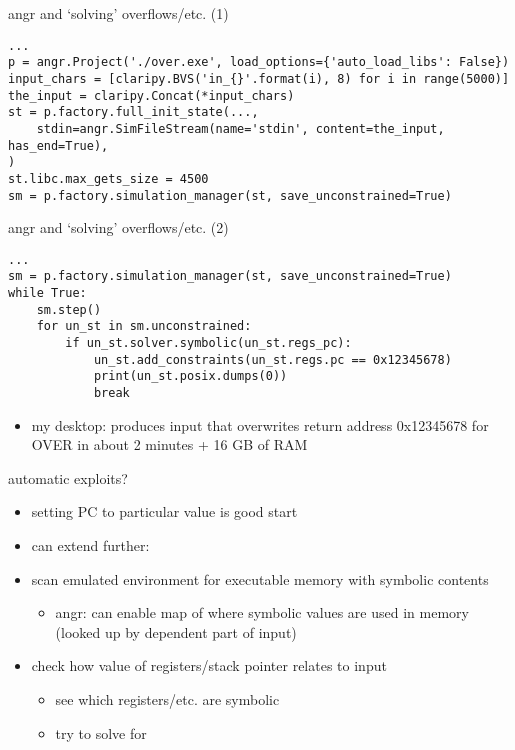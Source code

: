 \begin{frame}[fragile]{angr and `solving' overflows/etc. (1)}
\begin{Verbatim}[fontsize=\fontsize{9}{10}]
...
p = angr.Project('./over.exe', load_options={'auto_load_libs': False})
input_chars = [claripy.BVS('in_{}'.format(i), 8) for i in range(5000)]
the_input = claripy.Concat(*input_chars)
st = p.factory.full_init_state(...,
    stdin=angr.SimFileStream(name='stdin', content=the_input, has_end=True),
)
st.libc.max_gets_size = 4500
sm = p.factory.simulation_manager(st, save_unconstrained=True)
\end{Verbatim}
\end{frame}

\begin{frame}[fragile]{angr and `solving' overflows/etc. (2)}
\begin{Verbatim}[fontsize=\fontsize{9}{10}]
...
sm = p.factory.simulation_manager(st, save_unconstrained=True)
while True:
    sm.step()
    for un_st in sm.unconstrained:
        if un_st.solver.symbolic(un_st.regs_pc):
            un_st.add_constraints(un_st.regs.pc == 0x12345678)
            print(un_st.posix.dumps(0))
            break
\end{Verbatim}
\begin{itemize}
\item my desktop: produces input that overwrites return address 0x12345678 for OVER in about 2 minutes + 16 GB of RAM
\end{itemize}
\end{frame}

\begin{frame}{automatic exploits?}
\begin{itemize}
\item setting PC to particular value is good start
\item can extend further:
\item scan emulated environment for executable memory with symbolic contents
    \begin{itemize}
    \item angr: can enable map of where symbolic values are used in memory (looked up by dependent part of input)
    \end{itemize}
\item check how value of registers/stack pointer relates to input
    \begin{itemize}
    \item see which registers/etc. are symbolic
    \item try to solve for 
    \end{itemize}
\end{itemize}
\end{frame}


